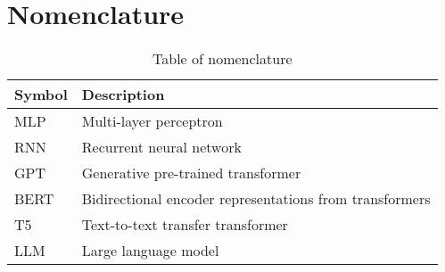 \chapter{Nomenclature}\label{app:nomenclature}

\begin{table}[H]
    \centering
    \begin{tabular}{ll}
        \toprule
        \textbf{Symbol} & \textbf{Description}                                    \\
        \midrule
        MLP             & Multi-layer perceptron                                  \\
        RNN             & Recurrent neural network                                \\
        GPT             & Generative pre-trained transformer                      \\
        BERT            & Bidirectional encoder representations from transformers \\
        T5              & Text-to-text transfer transformer                       \\
        LLM             & Large language model                                    \\
        \bottomrule
    \end{tabular}
    \caption{Table of nomenclature}
    \label{tab:nomenclature}
\end{table}